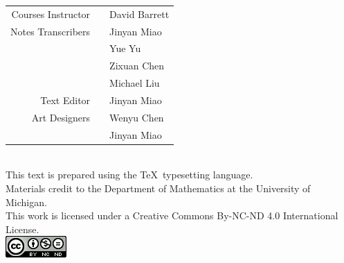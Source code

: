 \documentclass[15pt]{book}
\theoremstyle{break}
\theoremstyle{break}
\begin{document}
\newpage 
\tableofcontents
{}

\newpage
\setcounter{page}{1}
\vspace*{\fill}

\begin{center}
\begin{tabular}{rcl}
Courses Instructor & & David Barrett \medskip
\\
Notes Transcribers & & Jinyan Miao\\
 & & Yue Yu\\
 & & Zixuan Chen \\
 & & Michael Liu \medskip
\\
Text Editor & & Jinyan Miao \medskip
\\
Art Designers & & Wenyu Chen \\
 & & Jinyan Miao \bigskip
\end{tabular} \\
This text is prepared using the \TeX\ typesetting language. \\
Materials  credit to the Department of Mathematics at the University of Michigan.\\
This work is licensed under a Creative Commons By-NC-ND 4.0 International License.  \\
\medskip
\includegraphics[scale=0.8]{cclisence.png}
\end{center}
\end{document}

